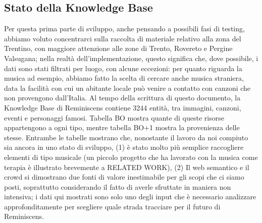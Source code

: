 \documentclass[sigproc-sp.tex]{subfiles}
\begin{document}
\subsection{Stato della Knowledge Base}
Per questa prima parte di sviluppo, anche pensando a possibili fasi di testing, abbiamo voluto concentrarci sulla raccolta di materiale relativo alla zona del Trentino, con maggiore attenzione alle zone di Trento, Rovereto e Pergine Valsugana; nella realtà dell’implementazione, questo significa che, dove possibile, i dati sono stati filtrati per luogo, con alcune eccezioni: per quanto riguarda la musica ad esempio, abbiamo fatto la scelta di cercare anche musica straniera, data la facilità con cui un abitante locale può venire a contatto con canzoni che non provengono dall’Italia. Al tempo della scrittura di questo documento, la Knowledge Base di Reminiscens contiene 3244 entità, tra immagini, canzoni, eventi e personaggi famosi. Tabella BO mostra quante di queste risorse appartengono a ogni tipo, mentre tabella BO+1 mostra la provenienza delle stesse. Entrambe le tabelle mostrano che, nonostante il lavoro da noi compiuto sia ancora in uno stato di sviluppo, (1) è stato molto più semplice raccogliere elementi di tipo musicale (un piccolo progetto che ha lavorato con la musica come terapia è illustrato brevemente a RELATED WORK), (2) Il web semantico e il crowd si dimostrano due fonti di valore inestimabile per gli scopi che ci siamo posti, soprattutto considerando il fatto di averle sfruttate in maniera non intensiva; i dati qui mostrati sono solo uno degli input che è necessario analizzare approfonditamente per scegliere quale strada tracciare per il futuro di Reminiscens.
\end{document}
